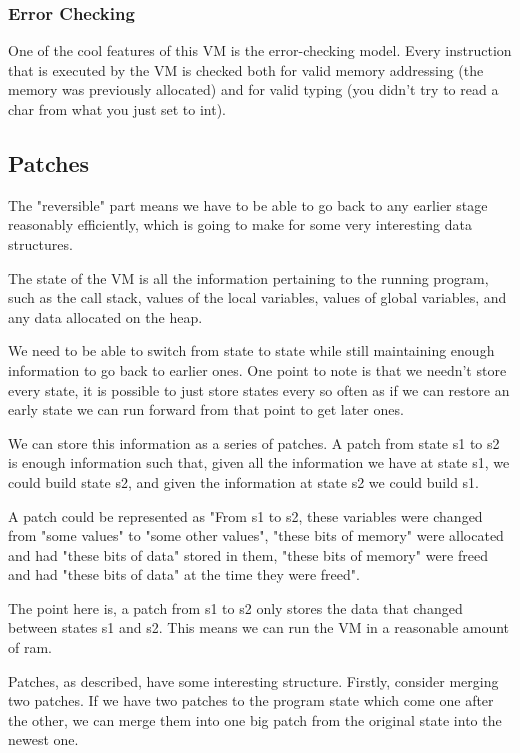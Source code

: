 \documentclass[a4paper]{report}
\begin{document}
\subsubsection{Error Checking}
One of the cool features of this VM is the error-checking model. Every instruction that is executed by the VM is checked both for valid memory addressing (the memory was previously allocated) and for valid typing (you didn't try to read a char from what you just set to int). 
\subsection{Patches}
The "reversible" part means we have to be able to go back to any earlier stage reasonably efficiently, which is going to make for some very interesting data structures.
\par
The state of the VM is all the information pertaining to the running program, such as the call stack, values of the local variables, values of global variables, and any data allocated on the heap.
\par
We need to be able to switch from state to state while still maintaining enough information to go back to earlier ones. One point to note is that we needn't store every state, it is possible to just store states every so often as if we can restore an early state we can run forward from that point to get later ones.
\par
We can store this information as a series of patches. A patch from state s1 to s2 is enough information such that, given all the information we have at state s1, we could build state s2, and given the information at state s2 we could build s1.
\par
A patch could be represented as "From s1 to s2, these variables were changed from "some values" to "some other values", "these bits of memory" were allocated and had "these bits of data" stored in them, "these bits of memory" were freed and had "these bits of data" at the time they were freed".
\par
The point here is, a patch from s1 to s2 only stores the data that changed between states s1 and s2. This means we can run the VM in a reasonable amount of ram.
\par
Patches, as described, have some interesting structure. Firstly, consider merging two patches. If we have two patches to the program state which come one after the other, we can merge them into one big patch from the original state into the newest one.
\par
\end{document}
